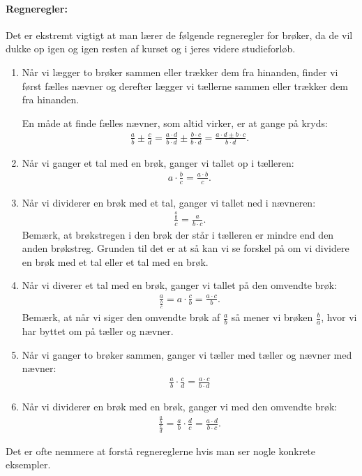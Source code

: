 \paragraph*{Regneregler:}
Det er ekstremt vigtigt at man lærer de følgende regneregler for brøker, da de vil dukke op igen og igen resten af kurset og i jeres videre studieforløb.
\begin{enumerate}
\item Når vi lægger to brøker sammen eller trækker dem fra hinanden, finder vi først fælles nævner og derefter lægger vi tællerne sammen eller trækker dem fra hinanden. 

En måde at finde fælles nævner, som altid virker, er at gange på kryds:
\begin{align*}
\frac{a}{b}\pm \frac{c}{d}= \frac{a \cdot d}{b \cdot d} \pm \frac{b \cdot c}{b \cdot d} = \frac{a \cdot d \pm b \cdot c}{b \cdot d}.
\end{align*}
\item Når vi ganger et tal med en brøk, ganger vi tallet op i tælleren:
\begin{align*}
a \cdot \frac{b}{c}=\frac{a \cdot b}{c}.
\end{align*}
\item Når vi dividerer en brøk med et tal, ganger vi tallet ned i nævneren:
\begin{align*}
\frac{\frac{a}{b}}{c}=\frac{a}{b\cdot c}.
\end{align*}
Bemærk, at brøkstregen i den brøk der står i tælleren er mindre end den anden brøkstreg. Grunden til det er at så kan vi se forskel på om vi dividere en brøk med et tal eller et tal med en brøk. 
\item Når vi diverer et tal med en brøk, ganger vi tallet på den omvendte brøk:
\begin{align*}
\frac{a}{\frac{b}{c}}= a \cdot \frac{c}{b} = \frac{a \cdot c}{b}.
\end{align*}
Bemærk, at når vi siger den omvendte brøk af $\frac{a}{b}$ så mener vi brøken $\frac{b}{a}$, hvor vi har byttet om på tæller og nævner.
\item Når vi ganger to brøker sammen, ganger vi tæller med tæller og nævner med nævner:
\begin{align*}
\frac{a}{b} \cdot \frac{c}{d} = \frac{a \cdot c}{b \cdot d}
\end{align*}
\item Når vi dividerer en brøk med en brøk, ganger vi med den omvendte brøk:
\begin{align*}
\frac{\frac{a}{b}}{\frac{c}{d}} = \frac{a}{b} \cdot \frac{d}{c} = \frac{a \cdot d}{b \cdot c}.
\end{align*}
\end{enumerate}
Det er ofte nemmere at forstå regnereglerne hvis man ser nogle konkrete eksempler.
